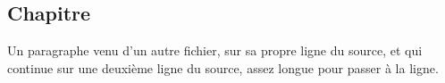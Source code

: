 \subsection{Chapitre}
Un paragraphe venu d'un autre fichier, sur sa propre ligne du source,
et qui continue sur une deuxième ligne du source, assez longue pour passer à la ligne.
